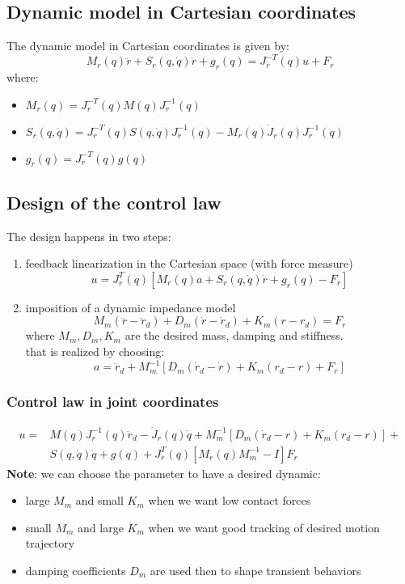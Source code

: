 \documentclass[a4paper,12pt]{article}
\begin{document}
\subsection{Dynamic model in Cartesian coordinates}
The dynamic model in Cartesian coordinates is given by:
\begin{equation}\label{eq:dynamic model in Cartesian coordinates}
    M_r(q)\ddot{r} + S_r(q,\dot{q})\dot{r} + g_r(q) = J_r^{-T}(q)u+F_r
\end{equation}
where:
\begin{itemize}
    \item $M_r(q)=J_r^{-T}(q)M(q)J_r^{-1}(q)$
    \item $S_r(q,\dot{q})=J_r^{-T}(q)S(q,\dot{q})J_r^{-1}(q) - M_r(q)\dot{J}_r(q)J_r^{-1}(q)$
    \item $g_r(q)=J_r^{-T}(q)g(q)$
\end{itemize}
\subsection{Design of the control law}
The design happens in two steps:
\begin{enumerate}
\item feedback linearization in the Cartesian space
 (with force measure) \begin{equation}
 u=J_r^T(q)[M_r(q)a+ S_r(q,\dot{q})\dot{r} + g_r(q) - F_r]
 \end{equation}
\item imposition of a dynamic impedance model \begin{equation}
M_m(\ddot{r}-\ddot{r}_d) + D_m(\dot{r}-\dot{r}_d) + K_m(r-r_d) = F_r
\end{equation}
where $M_m, D_m, K_m$ are the desired mass, damping and stiffness.\\
that is realized by choosing: \begin{equation}
a = \ddot{r}_d + M_m^{-1}[D_m(\dot{r}_d-\dot{r})+K_m(r_d-r)+F_r]
\end{equation}
\end{enumerate}
\subsubsection{Control law in joint coordinates}
\begin{equation}
    \begin{split}
u = & M(q)J_r^{-1}(q){\ddot{r}_d-\dot{J}_r(q)\dot{q}+M_m^{-1}[D_m(\dot{r}_d-r)+K_m(r_d-r)]}+ \\
&S(q,\dot{q})\dot{q}+g(q)+J_r^T(q)[M_r(q)M_m^{-1}-I]F_r
    \end{split}
\end{equation}
\textbf{Note}: we can choose the parameter to have a desired dynamic:
\begin{itemize}
    \item large $M_m$  and small $K_m$ when we want low contact forces
    \item small $M_m$ and large $K_m$ when we want good tracking of desired 
    motion trajectory
    \item damping coefficients $D_m$ are used then to shape transient behaviors
\end{itemize}
\end{document}
